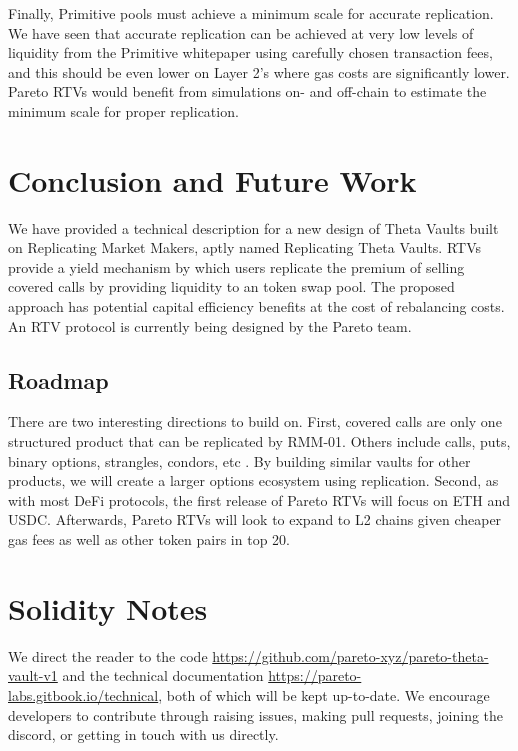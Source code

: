 \documentclass[hidelinks, 12pt]{article}
\begin{document}
Finally, Primitive pools must achieve a minimum scale for accurate replication. We have seen that accurate replication can be achieved at very low levels of liquidity from the Primitive whitepaper using carefully chosen transaction fees, and this should be even lower on Layer 2's where gas costs are significantly lower. Pareto RTVs would benefit from simulations on- and off-chain to estimate the minimum scale for proper replication.

\section{Conclusion and Future Work}

We have provided a technical description for a new design of Theta Vaults built on Replicating Market Makers, aptly named Replicating Theta Vaults. RTVs provide a yield mechanism by which users replicate the premium of selling covered calls by providing liquidity to an token swap pool. The proposed approach has potential capital efficiency benefits at the cost of rebalancing costs.
An RTV protocol is currently being designed by the Pareto team.

\subsection{Roadmap}

There are two interesting directions to build on. First, covered calls are only one structured product that can be replicated by RMM-01. Others include calls, puts, binary options, strangles, condors, etc \cite{sterrett2022replicating}. By building similar vaults for other products, we will create a larger options ecosystem using replication. Second, as with most DeFi protocols, the first release of Pareto RTVs will focus on ETH and USDC. Afterwards, Pareto RTVs will look to expand to L2 chains given cheaper gas fees as well as other token pairs in top 20.




\appendix

\section{Solidity Notes}

We direct the reader to the code \url{https://github.com/pareto-xyz/pareto-theta-vault-v1} and the technical documentation \url{https://pareto-labs.gitbook.io/technical}, both of which will be kept up-to-date. We encourage developers to contribute through raising issues, making pull requests, joining the discord, or getting in touch with us directly.
\end{document}
